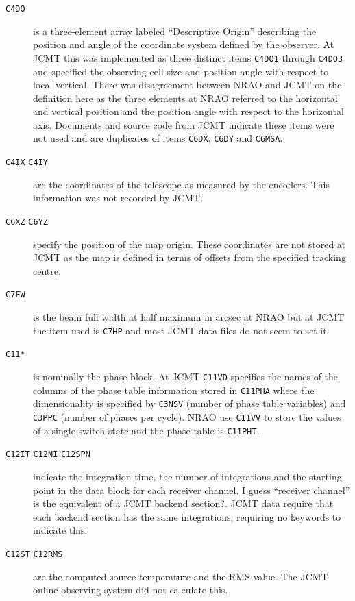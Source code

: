 \documentclass[final,authoryear,5p,times,twocolumn]{elsarticle}
\begin{document}
\begin{description}
\item[\texttt{C4DO}] is a three-element array labeled ``Descriptive
  Origin'' describing the position and angle of the coordinate system
  defined by the observer. At JCMT this was implemented as three
  distinct items \texttt{C4DO1} through \texttt{C4DO3} and specified
  the observing cell size and position angle with respect to local
  vertical. There was disagreement between NRAO and JCMT on the
  definition here as the three elements at NRAO referred to the
  horizontal and vertical position and the position angle with respect
  to the horizontal axis. Documents and source code from JCMT indicate
  these items were not used and are duplicates of items \texttt{C6DX},
  \texttt{C6DY} and \texttt{C6MSA}.

\item[\texttt{C4IX} \texttt{C4IY}] are the coordinates of the
  telescope as measured by the encoders. This information was not
  recorded by JCMT.

\item[\texttt{C6XZ} \texttt{C6YZ}] specify the position of the map
  origin. These coordinates are not stored at JCMT as the map is
  defined in terms of offsets from the specified tracking centre.

\item[\texttt{C7FW}] is the beam full width at half maximum in arcsec
  at NRAO but at JCMT the item used is \texttt{C7HP} and most JCMT data
  files do not seem to set it.

\item[\texttt{C11*}] is nominally the phase block. At JCMT
  \texttt{C11VD} specifies the names of the columns of the phase table
  information stored in \texttt{C11PHA} where the dimensionality is
  specified by \texttt{C3NSV} (number of phase table variables) and
  \texttt{C3PPC} (number of phases per cycle). NRAO use \texttt{C11VV}
  to store the values of a single switch state and the phase table is
  \texttt{C11PHT}.

\item[\texttt{C12IT} \texttt{C12NI} \texttt{C12SPN}] indicate the integration time,
  the number of integrations and the starting point in the data block
  for each receiver channel. {\color{red} I guess ``receiver channel''
    is the equivalent of a JCMT backend section?}. JCMT data require
  that each backend section has the same integrations, requiring no
  keywords to indicate this.

\item[\texttt{C12ST} \texttt{C12RMS}] are the computed source
  temperature and the RMS value. The JCMT online observing system did
  not calculate this.


\end{description}
\end{document}
